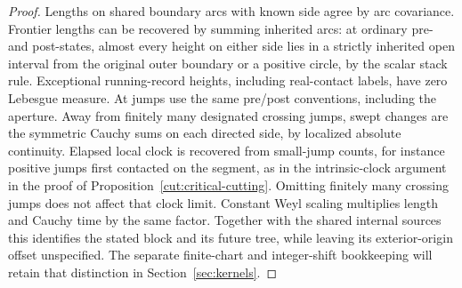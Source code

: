 \begin{proof}
Lengths on shared boundary arcs with known side agree by arc covariance.  Frontier lengths can be recovered by summing inherited arcs: at ordinary pre- and post-states, almost every height on either side lies in a strictly inherited open interval from the original outer boundary or a positive circle, by the scalar stack rule.  Exceptional running-record heights, including real-contact labels, have zero Lebesgue measure.  At jumps use the same pre/post conventions, including the aperture.  Away from finitely many designated crossing jumps, swept changes are the symmetric Cauchy sums on each directed side, by localized absolute continuity.  Elapsed local clock is recovered from small-jump counts, for instance positive jumps first contacted on the segment, as in the intrinsic-clock argument in the proof of Proposition~\ref{cut:critical-cutting}.  Omitting finitely many crossing jumps does not affect that clock limit.  Constant Weyl scaling multiplies length and Cauchy time by the same factor.  Together with the shared internal sources this identifies the stated block and its future tree, while leaving its exterior-origin offset unspecified.  The separate finite-chart and integer-shift bookkeeping will retain that distinction in Section~\ref{sec:kernels}.
\end{proof}
